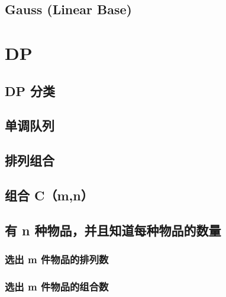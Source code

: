 \documentclass[a4paper]{article}
\begin{document}
\begin{CJK*}{UTF8}{gbsn}
\begin{multicols}{3}
\begin{flushleft}
\subsection{Gauss (Linear Base)}




\section{DP}

\subsection{DP 分类}


\subsection{单调队列}


\subsection{排列组合}



\subsection{组合 C（m,n）}


\subsection{有 n 种物品，并且知道每种物品的数量}


\subsubsection{选出 m 件物品的排列数}


\subsubsection{选出 m 件物品的组合数}



\end{flushleft}
\end{multicols}
\end{CJK*}
\end{document}
